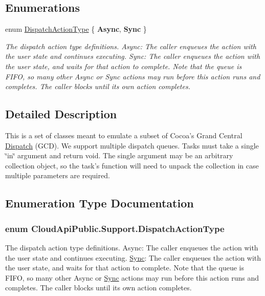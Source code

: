 \subsection*{Enumerations}
\begin{DoxyCompactItemize}
\item 
enum \hyperlink{namespace_cloud_api_public_1_1_support_ae4ed3cc109410edb339c363c77eb4117}{Dispatch\-Action\-Type} \{ {\bfseries Async}, 
{\bfseries Sync}
 \}
\begin{DoxyCompactList}\small\item\em The dispatch action type definitions. Async\-: The caller enqueues the action with the user state and continues executing. Sync\-: The caller enqueues the action with the user state, and waits for that action to complete. Note that the queue is F\-I\-F\-O, so many other Async or Sync actions may run before this action runs and completes. The caller blocks until its own action completes. \end{DoxyCompactList}\end{DoxyCompactItemize}


\subsection{Detailed Description}
This is a set of classes meant to emulate a subset of Cocoa's Grand Central \hyperlink{class_cloud_api_public_1_1_support_1_1_dispatch}{Dispatch} (G\-C\-D). We support multiple dispatch queues. Tasks must take a single \char`\"{}in\char`\"{} argument and return void. The single argument may be an arbitrary collection object, so the task's function will need to unpack the collection in case multiple parameters are required. 

\subsection{Enumeration Type Documentation}
\hypertarget{namespace_cloud_api_public_1_1_support_ae4ed3cc109410edb339c363c77eb4117}{
\subsubsection[{Dispatch\-Action\-Type}]{\setlength{\rightskip}{0pt plus 5cm}enum {\bf Cloud\-Api\-Public.\-Support.\-Dispatch\-Action\-Type}}}\label{namespace_cloud_api_public_1_1_support_ae4ed3cc109410edb339c363c77eb4117}


The dispatch action type definitions. Async\-: The caller enqueues the action with the user state and continues executing. \hyperlink{namespace_cloud_api_public_1_1_sync}{Sync}\-: The caller enqueues the action with the user state, and waits for that action to complete. Note that the queue is F\-I\-F\-O, so many other Async or \hyperlink{namespace_cloud_api_public_1_1_sync}{Sync} actions may run before this action runs and completes. The caller blocks until its own action completes. 

